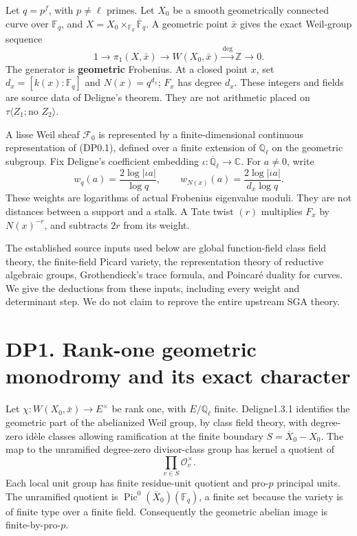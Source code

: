 \documentclass[
]{report}
\begin{document}
Let \(q=p^f\), with \(p\ne\ell\) primes. Let \(X_0\) be a smooth
geometrically connected curve over \(\mathbb F_q\), and
\(X=X_0\times_{\mathbb F_q}\overline{\mathbb F}_q\). A geometric point
\(\bar x\) gives the exact Weil-group sequence \[
1\longrightarrow\pi_1(X,\bar x)\longrightarrow W(X_0,\bar x)
 \xrightarrow{\deg}\mathbb Z\longrightarrow0.
\tag{DP0.1}
\] The generator is \textbf{geometric} Frobenius. At a closed point
\(x\), set \(d_x=[k(x):\mathbb F_q]\) and \(N(x)=q^{d_x}\); \(F_x\) has
degree \(d_x\). These integers and fields are source data of Deligne's
theorem. They are not arithmetic placed on
\(\tau\langle Z_1;\text{no }Z_2\rangle\).

A lisse Weil sheaf \(\mathcal F_0\) is represented by a
finite-dimensional continuous representation of (DP0.1), defined over a
finite extension of \(\mathbb Q_\ell\) on the geometric subgroup. Fix
Deligne's coefficient embedding
\(\iota:\overline{\mathbb Q}_\ell\to\mathbb C\). For \(a\ne0\), write \[
w_{q}(a)=\frac{2\log|\iota a|}{\log q},\qquad
w_{N(x)}(a)=\frac{2\log|\iota a|}{d_x\log q}.
\tag{DP0.2}
\] These weights are logarithms of actual Frobenius eigenvalue moduli.
They are not distances between a support and a stalk. A Tate twist
\((r)\) multiplies \(F_x\) by \(N(x)^{-r}\), and subtracts \(2r\) from
its weight.

The established source inputs used below are global function-field class
field theory, the finite-field Picard variety, the representation theory
of reductive algebraic groups, Grothendieck's trace formula, and
Poincaré duality for curves. We give the deductions from these inputs,
including every weight and determinant step. We do not claim to reprove
the entire upstream SGA theory.

\section{DP1. Rank-one geometric monodromy and its exact
character}\label{dp1.-rank-one-geometric-monodromy-and-its-exact-character}

Let \(\chi:W(X_0,\bar x)\to E^\times\) be rank one, with
\(E/\mathbb Q_\ell\) finite. Deligne1.3.1 identifies the geometric part
of the abelianized Weil group, by class field theory, with degree-zero
idèle classes allowing ramification at the finite boundary
\(S=\overline X_0-X_0\). The map to the unramified degree-zero
divisor-class group has kernel a quotient of \[
\prod_{v\in S}\mathcal O_v^\times.
\tag{DP1.1}
\] Each local unit group has finite residue-unit quotient and pro-\(p\)
principal units. The unramified quotient is
\(\operatorname{Pic}^0(\overline X_0)(\mathbb F_q)\), a finite set
because the variety is of finite type over a finite field. Consequently
the geometric abelian image is finite-by-pro-\(p\).
\end{document}

